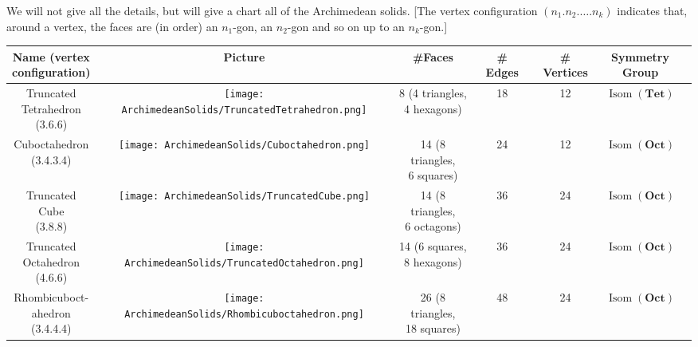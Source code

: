 \documentclass[leqno]{book}
\begin{document}
We will not give all the details, but will give a chart all of the Archimedean solids.  [The vertex configuration $(n_1.n_2.\dots.n_k)$ indicates that, around a vertex, the faces are (in order) an $n_1$-gon, an $n_2$-gon and so on up to an $n_k$-gon.]
\begin{center}
\begin{tabular}{ccccccc}
\parbox{2.5cm}{Name (vertex\\configuration)}&Picture&\#Faces&\# Edges&\# Vertices&\parbox{2cm}{Symmetry\\Group}\\\hline\hline

\parbox{2.5cm}{Truncated\\Tetrahedron\\(3.6.6)}&
\texttt{[image: ArchimedeanSolids/TruncatedTetrahedron.png]}&
8 \parbox{2cm}{(4 triangles,\\4 hexagons)}&
18&
12&
$\operatorname{Isom}(\mathbf{Tet})$\\\hline

\parbox{2.5cm}{Cuboctahedron\\(3.4.3.4)}&
\texttt{[image: ArchimedeanSolids/Cuboctahedron.png]}&
14 \parbox{2cm}{(8 triangles,\\6 squares)}&
24&
12&
$\operatorname{Isom}(\mathbf{Oct})$\\\hline

\parbox{2.5cm}{Truncated\\Cube\\(3.8.8)}&
\texttt{[image: ArchimedeanSolids/TruncatedCube.png]}&
14 \parbox{2cm}{(8 triangles,\\6 octagons)}&
36&
24&
$\operatorname{Isom}(\mathbf{Oct})$\\\hline

\parbox{2.5cm}{Truncated\\Octahedron\\(4.6.6)}&
\texttt{[image: ArchimedeanSolids/TruncatedOctahedron.png]}&
14 \parbox{2cm}{(6 squares,\\8 hexagons)}&
36&
24&
$\operatorname{Isom}(\mathbf{Oct})$\\\hline

\parbox{2.5cm}{Rhombicuboct-\\ahedron\\(3.4.4.4)}&
\texttt{[image: ArchimedeanSolids/Rhombicuboctahedron.png]}&
26 \parbox{2cm}{(8 triangles,\\18 squares)}&
48&
24&
$\operatorname{Isom}(\mathbf{Oct})$\\\hline


\end{tabular}
\end{center}
\end{document}
